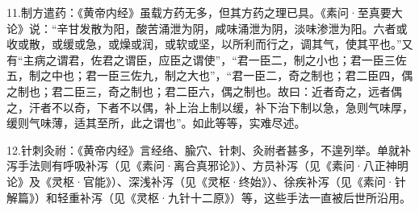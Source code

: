 \documentclass[12pt,UTF8]{ctexbook}
\begin{document}
11.制方遣药：《黄帝内经》虽载方药无多，但其方药之理已具。《素问·至真要大论》说：“辛甘发散为阳，酸苦涌泄为阴，咸味涌泄为阴，淡味渗泄为阳。六者或收或散，或缓或急，或燥或润，或软或坚，以所利而行之，调其气，使其平也。”又有“主病之谓君，佐君之谓臣，应臣之谓使”，“君一臣二，制之小也；君一臣三佐五，制之中也；君一臣三佐九，制之大也”，“君一臣二，奇之制也；君二臣四，偶之制也；君二臣三，奇之制也；君二臣六，偶之制也。故曰：近者奇之，远者偶之，汗者不以奇，下者不以偶，补上治上制以缓，补下治下制以急，急则气味厚，缓则气味薄，适其至所，此之谓也”。如此等等，实难尽述。

12.针刺灸祔：《黄帝内经》言经络、腧穴、针刺、灸祔者甚多，不遑列举。单就补泻手法则有呼吸补泻（见《素问·离合真邪论》）、方员补泻（见《素问·八正神明论》及《灵枢·官能》）、深浅补泻（见《灵枢·终始》）、徐疾补泻（见《素问·针解篇》）和轻重补泻（见《灵枢·九针十二原》）等，这些手法一直被后世所沿用。

\mainmatter
\end{document}
